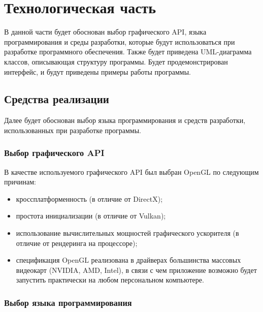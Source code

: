 \section{Технологическая часть}

В данной части будет обоснован выбор графического API, языка программирования и среды разработки, которые будут использоваться при разработке программного обеспечения.
Также будет приведена UML-диаграмма классов, описывающая структуру программы.
Будет продемонстрирован интерфейс, и будут приведены примеры работы программы.


\subsection{Средства реализации}

Далее будет обоснован выбор языка программирования и средств разработки, использованных при разработке программы.

\subsubsection{Выбор графического API}

В качестве используемого графического API был выбран OpenGL по следующим причинам:
\begin{itemize}
    \item кроссплатформенность (в отличие от DirectX);
    \item простота инициализации (в отличие от Vulkan);
    \item использование вычислительных мощностей графического ускорителя (в отличие от рендеринга на процессоре);
    \item спецификация OpenGL реализована в драйверах большинства массовых видеокарт (NVIDIA, AMD, Intel), в связи с чем приложение возможно будет запустить практически на любом персональном компьютере.
\end{itemize}

\subsubsection{Выбор языка программирования}

